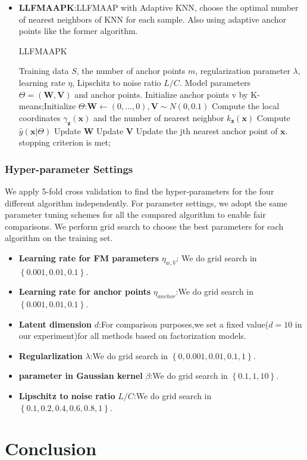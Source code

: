 \documentclass{article}
\begin{document}
\begin{itemize}
\begin{algorithm}[H]
	\end{algorithm}
	\item \textbf{LLFMAAPK}:LLFMAAP with Adaptive KNN, choose the optimal number of nearest neighbors of KNN for each sample. Also using adaptive anchor points like the former algorithm.
	\begin{algorithm}[H]
		\caption{LLFMAAPK}
		\begin{algorithmic}[1]
			\REQUIRE Training data $S$, the number of anchor points $m$, regularization parameter $\lambda$, learning rate $\eta$, Lipschitz to noise ratio $L/C$.
			\ENSURE Model parameters $\Theta = (\boldsymbol W, \boldsymbol V)$ and anchor points.
			\STATE Initialize anchor points v by K-means;Initialize $\Theta$:$\boldsymbol W\leftarrow(0,...,0),\boldsymbol V\sim N(0,0.1)$
			\REPEAT 
			\STATE Compute the local coordinates $\gamma_{\boldsymbol{z}}(\boldsymbol{x})$ and the number of nearest neighbor $k_{\boldsymbol{z}}(\boldsymbol{x})$
			\STATE Compute $\hat{y}(\boldsymbol{x}|\Theta)$
			\STATE Update $\boldsymbol W$
			\STATE Update $\boldsymbol V$
			\STATE Update the jth nearest anchor point of $\boldsymbol{x}$.
			\ENDFOR
			\ENDFOR
			\UNTIL stopping criterion is met;
		\end{algorithmic}
	\end{algorithm}
\end{itemize}

\subsubsection{Hyper-parameter Settings}
We apply 5-fold cross validation to find the hyper-parameters for the four different algorithm independently. For parameter settings, we adopt the same parameter tuning schemes for all the compared algorithm to enable fair comparisons. We perform grid search to choose the best parameters for each algorithm on the training set.
\begin{itemize}
	\item \textbf{Learning rate for FM parameters} $\eta_{w,V}$: We do grid search in $\left\{0.001,0.01,0.1\right\}$.
	\item \textbf{Learning rate for anchor points} $\eta_{anchor}$:We do grid search in $\left\{0.001,0.01,0.1\right\}$.
	\item \textbf{Latent dimension} $d$:For comparison purposes,we set a fixed value($d = 10$ in our experiment)for all methods based on factorization
	models.
	\item \textbf{Regularlization} $\lambda$:We do grid search in $\left\{0,0.001,0.01,0.1,1\right\}$.
	\item \textbf{parameter in Gaussian kernel} $\beta$:We do grid search in $\left\{0.1,1,10\right\}$.
	\item \textbf{Lipschitz to noise ratio} $L/C$:We do grid search in $\left\{0.1,0.2,0.4,0.6,0.8,1\right\}$.
\end{itemize}
\section{Conclusion}


\end{document}
